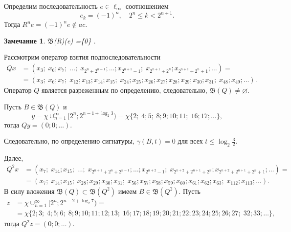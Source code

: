 \documentclass[a4paper,14pt]{article} %
\newcommand{\B}{\ensuremath{\mathfrak{B}}}
\theoremstyle{plain}
\newtheorem{remark}[lemma]{Замечание}
\begin{document}
	Определим последовательность $e\in\ell_\infty$ соотношением
	\begin{equation}
		e_k = (-1)^n, \quad 2^n \leq k < 2^{n+1}
		.
	\end{equation}
	Тогда $R^n e = (-1)^n e \notin ac$.

\begin{remark}
	\B(R)(e) =\{0\}
	.
\end{remark}


Рассмотрим оператор взятия подпоследовательности
\begin{align*}
	Qx &= (x_3; \; x_6; x_7; \; \ldots; \;
	x_{2^n + 2^{n - 1}}; \ldots; x_{2^{n + 1} - 1}; \;
	x_{2^{n + 1} + 2^n}; x_{2^{n + 1} + 2^n + 1}; \ldots) = \\
	&= (x_3; \; x_6; x_7; \; x_{12}; x_{13}; x_{14}; x_{15}; \;
	x_{24}; x_{25}; x_{26}; x_{27}; x_{28}; x_{29}; x_{30}; x_{31}; \;
	x_{48}; x_{49}; \ldots).
\end{align*}
Оператор $Q$ является разреженным по определению, следовательно,
$\mathfrak B(Q) \neq \varnothing$.

Пусть $B \in \mathfrak B(Q)$ и
$$
	y = \chi \cup^\infty_{n = 1}
	[2^n; 2^{n - 1 + \log_2 3}) =
	\chi\{2; \; 4; 5; \; 8; 9; 10; 11; \;
	16; 17; \ldots\},
$$
тогда $Qy = (0; 0; \ldots)$.

Следовательно, по определению сигнатуры,
$\gamma(B, t) = 0$ для всех $t \leqslant
\log_2 \frac 32$.

Далее,
\begin{align*}
	Q^2 x &= (x_7; \; x_{14}; x_{15}; \; \ldots; \;
	x_{2^{n + 1} + 2^n + 2^{n - 1}}; \ldots; x_{2^{n + 2} - 1}; \;
	x_{2^{n + 2} + 2^{n + 1} + 2^n}; x_{2^{n + 2} + 2^{n + 1} + 2^n + 1}; \ldots) = \\
	&= (x_7; \; x_{14}; x_{15}; \; x_{28}; x_{29}; x_{30}; x_{31}; \;
	x_{56}; x_{57}; x_{58}; x_{59}; x_{60}; x_{61}; x_{62}; x_{63}; \;
	x_{112}; x_{113}; \ldots).
\end{align*}
В силу вложения $\mathfrak B(Q) \subset \mathfrak B(Q^2)$ имеем
$B \in \mathfrak B(Q^2)$. Пусть
\begin{align*}
	z &= \chi \cup^\infty_{n = 1} [2^n; 2^{n - 2 + \log_2 7}) = \\
	&= \chi\{2; 3; \; 4; 5; 6; \; 8; 9; 10; 11; 12; 13; \;
	16; 17; 18; 19; 20; 21; 22; 23; 24; 25; 26; 27; \;
	32; 33; \ldots\},
\end{align*}
тогда $Q^2 z = (0; 0; \ldots)$.
\end{document}
